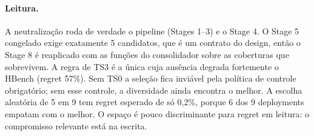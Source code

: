 \paragraph{Leitura.} A neutralização roda de verdade o pipeline (Stages 1--3) e o Stage 4. O Stage 5 congelado exige exatamente 5 candidatos, que é um contrato do design, então o Stage 8 é reaplicado com as funções do consolidador sobre as coberturas que sobrevivem. A regra de TS3 é a única cuja ausência degrada fortemente o HBench (regret 57\%). Sem TS0 a seleção fica inviável pela política de controle obrigatório; sem esse controle, a diversidade ainda encontra o melhor. A escolha aleatória de 5 em 9 tem regret esperado de só 0,2\%, porque 6 dos 9 deployments empatam com o melhor. O espaço é pouco discriminante para regret em leitura: o compromisso relevante está na escrita.
